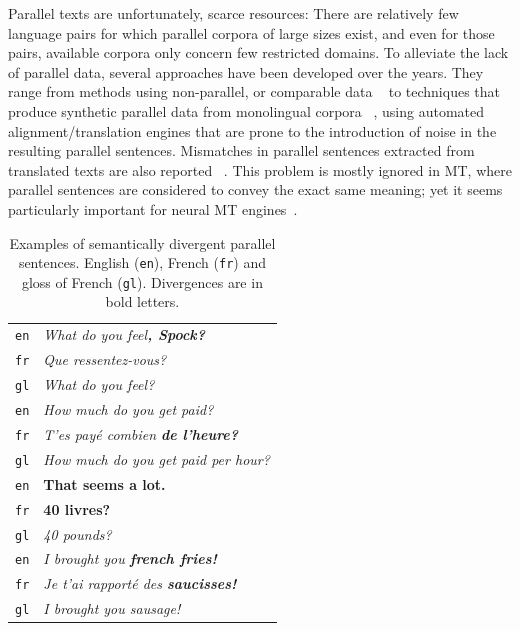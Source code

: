 \documentclass[11pt,a4paper]{article}
\begin{document}
Parallel texts are unfortunately, scarce resources:
There are relatively few language pairs for which parallel corpora of large sizes exist, and even for those pairs, available corpora only concern few restricted domains. 
To alleviate the lack of parallel data, several approaches have been developed over the years. 
They range from methods using non-parallel, or comparable data 
~\cite{Zhao:2002:APS:844380.844785,W04-3208,J05-4003,GregoireL18,P17-3003,P18-2037} to techniques that produce synthetic parallel data from monolingual corpora ~\cite{P16-1009,W17-4714}, using automated alignment/translation engines that are prone to the introduction of noise in the resulting parallel sentences. 
Mismatches in parallel sentences extracted from translated texts are also reported ~\cite{tiedemann2011bitext,XU16.310}. 
This problem is mostly ignored in MT, where parallel sentences are considered to convey the exact same meaning; yet it seems particularly important for neural MT engines~\cite{chen2016adaptation}.

\begin{table}[ht]
\small
\center
\begin{tabular}{ c|l }
  \hline  
  \texttt{en} & \it{What do you feel}\bf{, Spock}\it{?} \\
  \texttt{fr} & \it{Que ressentez-vous?} \\
  \texttt{gl} & {\small \it{What do you feel?}} \\
  \hline
  \texttt{en} & \it{How much do you get paid?} \\
  \texttt{fr} & \it{T'es pay\'e combien} \bf{de l'heure}\it{?} \\
  \texttt{gl} & {\small \it{How much do you get paid per hour?}} \\
  \hline  
  \texttt{en} &  \bf{That seems a lot.} \\
  \texttt{fr} & \bf{40 livres?} \\
  \texttt{gl} & {\small \it{40 pounds?}} \\
  \hline  
  \texttt{en} & \it{I brought you} \bf{french fries}\it{!} \\
  \texttt{fr} & \it{Je t'ai rapport\'e des} \bf{saucisses}\it{!} \\
  \texttt{gl} & {\small \it{I brought you sausage!}} \\
  \hline
\end{tabular}
\caption[Table caption text]{Examples of semantically divergent parallel sentences. English (\texttt{en}), French (\texttt{fr}) and gloss of French (\texttt{gl}). Divergences are in bold letters. }
\label{tab:examples}
\end{table}
\end{document}
